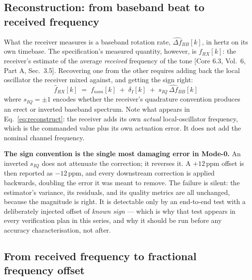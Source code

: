 \documentclass[11pt,a4paper]{article}
\newcommand{\core}[1]{\textcolor{rulegrey}{\small[Core 6.3, #1]}}
\begin{document}
\subsection{Reconstruction: from baseband beat to received frequency}

What the receiver measures is a baseband rotation rate, $\widehat{\Delta f}_{BB}[k]$, in hertz on its
own timebase. The specification's measured quantity, however, is $f_{RX}[k]$: the receiver's estimate
of the average \emph{received} frequency of the tone \core{Vol.\ 6, Part A, Sec.\ 3.5}. Recovering
one from the other requires adding back the local oscillator the receiver mixed against, and getting
the sign right:
\begin{equation}
\boxed{\;
\widehat f_{RX}[k] \;=\; f_{nom}[k] \;+\; \delta_I[k] \;+\; s_{IQ}\,\widehat{\Delta f}_{BB}[k] \;}
\label{eq:reconstruct}
\end{equation}
where $s_{IQ}=\pm1$ encodes whether the receiver's quadrature convention produces an erect or
inverted baseband spectrum. Note what appears in Eq.~\eqref{eq:reconstruct}: the receiver adds its
own \emph{actual} local-oscillator frequency, which is the commanded value plus its own actuation
error. It does not add the nominal channel frequency.

\begin{caution}
\textbf{The sign convention is the single most damaging error in Mode-0.} An inverted $s_{IQ}$ does
not attenuate the correction; it reverses it. A $+12$\,ppm offset is then reported as $-12$\,ppm, and
every downstream correction is applied backwards, doubling the error it was meant to remove. The
failure is silent: the estimator's variance, its residuals, and its quality metrics are all unchanged,
because the magnitude is right. It is detectable only by an end-to-end test with a deliberately
injected offset of \emph{known sign} --- which is why that test appears in every verification plan in
this series, and why it should be run before any accuracy characterisation, not after.
\end{caution}

\subsection{From received frequency to fractional frequency offset}
\end{document}
